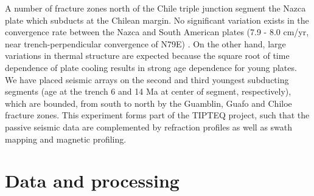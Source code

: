 \documentclass[reviewcopy]{elsarticle}
\begin{document}
A number of fracture zones north of the Chile triple junction segment
the Nazca plate which subducts at the Chilean margin. No significant
variation exists in
%
%
the convergence rate between the Nazca and South American
plates (7.9  - 8.0 cm/yr, near trench-perpendicular convergence of
N79E) \citep{demets94}.
On the other hand, large variations in thermal structure are expected
because the square root of time dependence of plate cooling results in
strong age dependence for young plates.
We have placed seismic arrays on the second and
third youngest subducting
segments (age at the trench 6 and 14 Ma at center of segment, respectively), which are
bounded, from south to north by the Guamblin, Guafo and Chiloe
fracture zones.  This
experiment forms part of the TIPTEQ project, such that the passive
seismic data are complemented by refraction profiles as
well as swath mapping and magnetic profiling.

\section{Data and processing}
\end{document}
